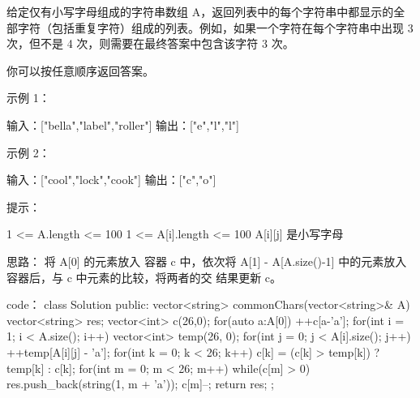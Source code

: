 给定仅有小写字母组成的字符串数组 A，返回列表中的每个字符串中都显示的全部字符（包括重复字符）组成的列表。例如，如果一个字符在每个字符串中出现 3 次，但不是 4 次，则需要在最终答案中包含该字符 3 次。

你可以按任意顺序返回答案。

 

示例 1：

输入：["bella","label","roller"]
输出：["e","l","l"]

示例 2：

输入：["cool","lock","cook"]
输出：["c","o"]

 

提示：

    1 <= A.length <= 100
    1 <= A[i].length <= 100
    A[i][j] 是小写字母

































思路：
将 A[0] 的元素放入 容器 c 中，依次将 A[1] - A[A.size()-1] 中的元素放入容器后，与 c 中元素的比较，将两者的交 结果更新 c。 


































code：
class Solution {
public:
    vector<string> commonChars(vector<string>& A) {
        vector<string> res;
        vector<int> c(26,0);
        for(auto a:A[0])
            ++c[a-'a'];
        for(int i = 1; i < A.size(); i++)
        {
            vector<int> temp(26, 0);
            for(int j = 0; j < A[i].size(); j++)
            {
                ++temp[A[i][j] - 'a'];
            }
            for(int k = 0; k < 26; k++)
            {
                c[k] = (c[k] > temp[k]) ? temp[k] : c[k];
            }
        }
        for(int m = 0; m < 26; m++)
        {
            while(c[m] > 0)
            {
                res.push_back(string(1, m + 'a'));
                c[m]--;
            }
        }
        return res;
    }
};